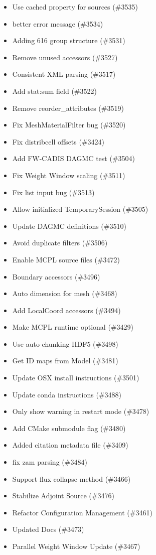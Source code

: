 \begin{itemize}
\item Use cached property for sources (\#3535)
\item better error message (\#3534)
\item Adding 616 group structure (\#3531)
\item Remove unused accessors (\#3527)
\item Consistent XML parsing (\#3517)
\item Add stat:sum field (\#3522)
\item Remove reorder\_attributes (\#3519)
\item Fix MeshMaterialFilter bug (\#3520)
\item Fix distribcell offsets (\#3424)
\item Add FW-CADIS DAGMC test (\#3504)
\item Fix Weight Window scaling (\#3511)
\item Fix list input bug (\#3513)
\item Allow initialized TemporarySession (\#3505)
\item Update DAGMC definitions (\#3510)
\item Avoid duplicate filters (\#3506)
\item Enable MCPL source files (\#3472)
\item Boundary accessors (\#3496)
\item Auto dimension for mesh (\#3468)
\item Add LocalCoord accessors (\#3494)
\item Make MCPL runtime optional (\#3429)
\item Use auto-chunking HDF5 (\#3498)
\item Get ID maps from Model (\#3481)
\item Update OSX install instructions (\#3501)
\item Update conda instructions (\#3488)
\item Only show warning in restart mode (\#3478)
\item Add CMake submodule flag (\#3480)
\item Added citation metadata file (\#3409)
\item fix zam parsing (\#3484)
\item Support flux collapse method (\#3466)
\item Stabilize Adjoint Source (\#3476)
\item Refactor Configuration Management (\#3461)
\item Updated Docs (\#3473)
\item Parallel Weight Window Update (\#3467)

\end{itemize}
